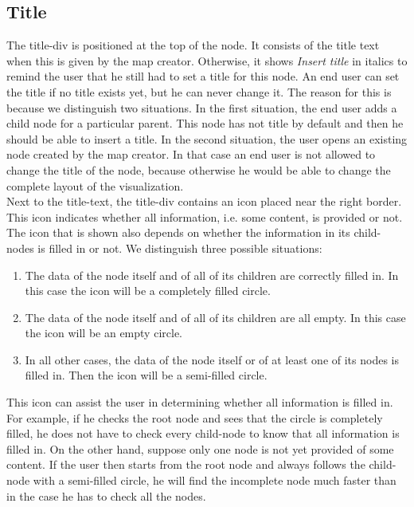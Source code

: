 \subsection{Title}
The title-div is positioned at the top of the node. It consists of the title text when this is given by the map creator. Otherwise, it shows \textit{Insert title} in italics to remind the user that he still had to set a title for this node. An end user can set the title if no title exists yet, but he can never change it. The reason for this is because we distinguish two situations. In the first situation, the end user adds a child node for a particular parent. This node has not title by default and then he should be able to insert a title. In the second situation, the user opens an existing node created by the map creator. In that case an end user is not allowed to change the title of the node, because otherwise he would be able to change the complete layout of the visualization. \\

Next to the title-text, the title-div contains an icon placed near the right border. This icon indicates whether all information, i.e. some content, is provided or not. The icon that is shown also depends on whether the information in its child-nodes is filled in or not. We distinguish three possible situations:
\begin{enumerate}
	\item The data of the node itself and of all of its children are correctly filled in. In this case the icon will be a completely filled circle.
	\item The data of the node itself and of all of its children are all empty. In this case the icon will be an empty circle.
	\item In all other cases, the data of the node itself or of at least one of its nodes is filled in. Then the icon will be a semi-filled circle.
\end{enumerate}
This icon can assist the user in determining whether all information is filled in. For example, if he checks the root node and sees that the circle is completely filled, he does not have to check every child-node to know that all information is filled in. On the other hand, suppose only one node is not yet provided of some content. If the user then starts from the root node and always follows the child-node with a semi-filled circle, he will find the incomplete node much faster than in the case he has to check all the nodes.



